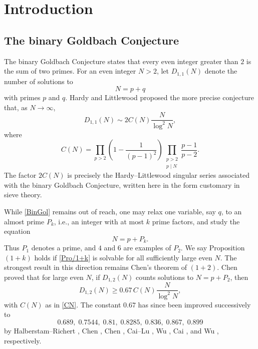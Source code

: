 \documentclass[12pt, a4paper]{amsart}
\def\ge{\geqslant}
\theoremstyle{plain}
\theoremstyle{remark}
\numberwithin{equation}{section}
\begin{document}
\section{Introduction}\label{sec1}
\subsection{The binary Goldbach Conjecture}
The binary Goldbach Conjecture states that every even integer greater than $2$ is the sum of two primes. 
For an even integer $N>2$, let $D_{1,1}(N)$ denote the number of solutions to
\begin{equation}\label{BinGol}
N = p + q
\end{equation}
with primes $p$ and $q$.  
Hardy and Littlewood \cite{HL23} proposed the more precise conjecture that, as $N \to \infty$,
\begin{equation}\label{D11}
D_{1,1}(N) \sim 2C(N) \frac{N}{\log^2 N},
\end{equation}
where
\begin{equation}\label{CN}
C(N) = \prod_{p>2} \left(1 - \frac{1}{(p-1)^2}\right) \prod_{\substack{p>2 \\ p \mid N}} \frac{p-1}{p-2}.
\end{equation}
The factor $2C(N)$ is precisely the Hardy--Littlewood singular series associated with the binary Goldbach Conjecture, 
written here in the form customary in sieve theory.

While \eqref{BinGol} remains out of reach, one may relax one variable, say $q$, 
to an almost prime $P_k$, i.e., an integer with at most $k$ prime factors, and study the equation 
\begin{equation}\label{Pro/1+k}
N = p + P_k.
\end{equation}
Thus $P_1$ denotes a prime, and $4$ and $6$ are examples of $P_2$.  
We say Proposition $(1+k)$ holds if \eqref{Pro/1+k} is solvable for all sufficiently large even $N$.  
The strongest result in this direction remains Chen’s theorem of $(1+2)$.  
Chen \cite{Chen66, Chen73} proved that for large even $N$, if $D_{1,2}(N)$ counts solutions to $N = p + P_2$, then
\begin{equation}\label{D12}
D_{1,2}(N) \ge 0.67 \, C(N) \frac{N}{\log^2 N},
\end{equation}
with $C(N)$ as in \eqref{CN}. The constant $0.67$ has since been improved successively to
\[
0.689,\; 0.7544,\; 0.81,\; 0.8285,\; 0.836,\; 0.867,\; 0.899
\]
by Halberstam--Richert \cite{HR74}, Chen \cite{Chen78II}, Chen \cite{Chen78}, Cai--Lu \cite{CaLu02}, Wu \cite{Wu04}, Cai \cite{Cai08a}, and Wu \cite{Wu08}, respectively.
\end{document}
